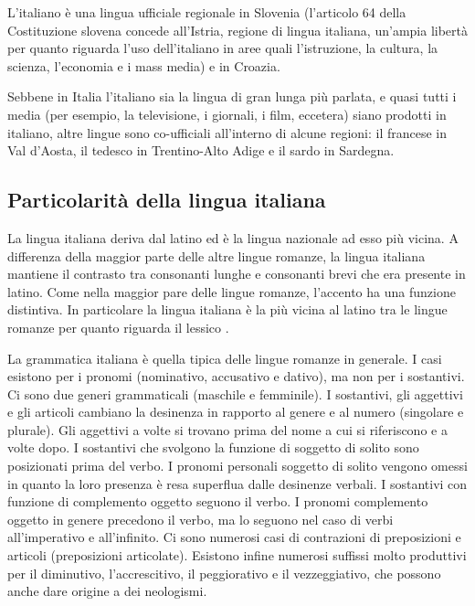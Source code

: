 \begin{multicols}{2}
L'italiano \`{e} una lingua ufficiale regionale in Slovenia
(l'articolo 64 della Costituzione slovena concede all'Istria, regione di
lingua italiana, un'ampia libert\`{a} per quanto riguarda l'uso dell'italiano
in aree quali l'istruzione, la cultura, la scienza, l'economia e i mass media)
e in Croazia. 

Sebbene in Italia l'italiano sia la lingua di gran lunga pi\`{u} parlata, e quasi
tutti i media (per esempio, la televisione, i giornali, i film, eccetera)
siano prodotti in italiano, altre lingue sono co-ufficiali all'interno di
alcune regioni: il francese in Val d'Aosta, il tedesco in Trentino-Alto Adige
e il sardo in Sardegna.

\subsection{Particolarit\`{a} della lingua italiana}

La lingua italiana deriva dal latino ed \`{e} la lingua nazionale ad esso pi\`{u} vicina. A differenza della maggior parte delle altre lingue romanze, la lingua italiana mantiene il contrasto tra consonanti lunghe e consonanti brevi che era presente in latino. Come nella maggior pare delle lingue romanze, l'accento ha una funzione distintiva. In particolare la lingua italiana \`{e} la pi\`{u} vicina al latino tra le lingue romanze per quanto riguarda il lessico \cite{ethnologue}.

La grammatica italiana \`{e} quella tipica delle lingue romanze in generale. I
casi esistono per i pronomi (nominativo, accusativo e dativo), ma non per i
sostantivi. Ci sono due generi grammaticali (maschile e femminile). I
sostantivi, gli aggettivi e gli articoli cambiano la desinenza in rapporto al
genere e al numero (singolare e plurale). Gli aggettivi a volte si trovano
prima del nome a cui si riferiscono e a volte dopo. I sostantivi che svolgono
la funzione di soggetto di solito sono posizionati prima del verbo. I pronomi
personali soggetto di solito vengono omessi in quanto la loro presenza \`{e}
resa superflua dalle desinenze verbali. I sostantivi con funzione di
complemento oggetto seguono il verbo. I pronomi complemento oggetto in genere
precedono il verbo, ma lo seguono nel caso di verbi all'imperativo e
all'infinito. Ci sono numerosi casi di contrazioni di preposizioni e articoli
(preposizioni articolate). Esistono infine numerosi suffissi molto produttivi
per il diminutivo, l'accrescitivo, il peggiorativo e il vezzeggiativo, che
possono anche dare origine a dei neologismi.


\end{multicols}

